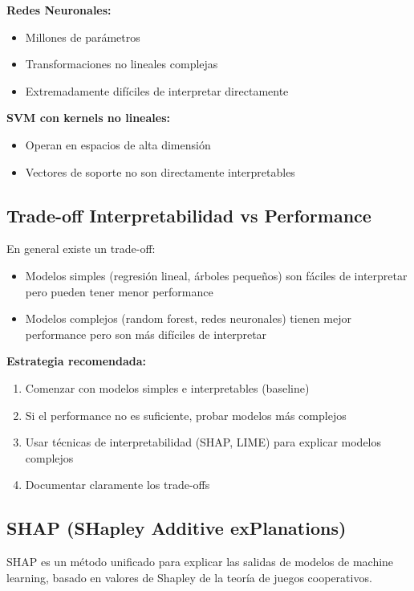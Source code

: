 \documentclass[11pt,a4paper]{article}
\begin{document}
\textbf{Redes Neuronales:}
\begin{itemize}
\item Millones de parámetros
\item Transformaciones no lineales complejas
\item Extremadamente difíciles de interpretar directamente
\end{itemize}

\textbf{SVM con kernels no lineales:}
\begin{itemize}
\item Operan en espacios de alta dimensión
\item Vectores de soporte no son directamente interpretables
\end{itemize}

\subsection{Trade-off Interpretabilidad vs Performance}

En general existe un trade-off:
\begin{itemize}
\item Modelos simples (regresión lineal, árboles pequeños) son fáciles de interpretar pero pueden tener menor performance
\item Modelos complejos (random forest, redes neuronales) tienen mejor performance pero son más difíciles de interpretar
\end{itemize}

\textbf{Estrategia recomendada:}
\begin{enumerate}
\item Comenzar con modelos simples e interpretables (baseline)
\item Si el performance no es suficiente, probar modelos más complejos
\item Usar técnicas de interpretabilidad (SHAP, LIME) para explicar modelos complejos
\item Documentar claramente los trade-offs
\end{enumerate}

\subsection{SHAP (SHapley Additive exPlanations)}

SHAP es un método unificado para explicar las salidas de modelos de machine learning, basado en valores de Shapley de la teoría de juegos cooperativos.
\end{document}
